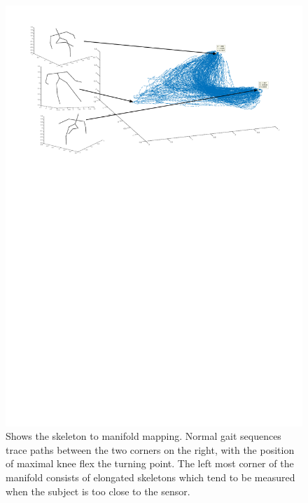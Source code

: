 \documentclass[11pt]{article} %
\begin{document}
\begin{figure}
\centering
\includegraphics*[trim={1cm 18cm 1cm 1cm},clip,width=0.96\linewidth,clip]{skelToManifod} 
\caption{Shows the skeleton to manifold mapping. Normal gait sequences trace paths between the two corners on the right, with the position of maximal knee flex the turning point. The left most corner of the manifold consists of elongated skeletons which tend to be measured when the subject is too close to the sensor. }
\label{fig:skelToManifod}
\end{figure}
\end{document}
